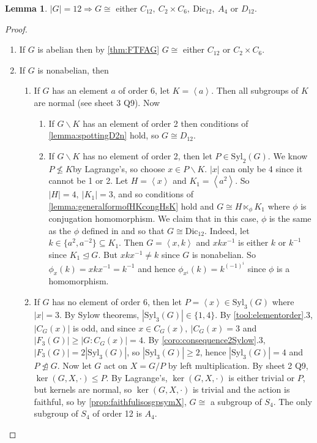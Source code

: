 \documentclass[a4paper]{article}
\newcommand{\la}{\left\langle}
\newcommand{\ra}{\right\rangle}
\newcommand{\Dic}{\text{Dic}}
\newcommand{\Syl}{\text{Syl}}
\theoremstyle{definition}
\newtheorem{lemma}[defn]{Lemma}
\begin{document}
\begin{lemma}
$|G|=12\Rightarrow G\cong$ either $C_{12},\ C_2\times C_6,\ \Dic_{12},\ A_4$ or $D_{12}$.
\end{lemma}
\begin{proof}
\begin{enumerate}
\item If $G$ is abelian then by \ref{thm:FTFAG} $G\cong$ either $C_{12}$ or $C_2\times C_6$.
\item If $G$ is nonabelian, then
\begin{enumerate}
\item If $G$ has an element $a$ of order 6, let $K=\la a\ra$. Then all subgroups of $K$ are normal (see sheet 3 Q9). Now
\begin{enumerate}
\item If $G\backslash K$ has an element of order 2 then conditions of \ref{lemma:spottingD2n} hold, so $G\cong D_{12}$.
\item If $G\backslash K$ has no element of order 2, then let $P\in\Syl_2(G)$. We know $P\not\leq K$by Lagrange's, so choose $x\in P\backslash K$. $|x|$ can only be 4 since it cannot be 1 or 2. Let $H=\la x\ra$ and $K_1=\la a^2\ra$. So $|H|=4,\ |K_1|=3$, and so conditions of \ref{lemma:generalformofHKcongHsK} hold and $G\cong H\ltimes_\phi K_1$ where $\phi$ is conjugation homomorphism. We claim that in this case, $\phi$ is the same as the $\phi$ defined in \label{defn:dic} and so that $G\cong\Dic_{12}$. Indeed, let $k\in\{a^2,a^{-2}\}\subseteq K_1$. Then $G=\la x,k\ra$ and $xkx^{-1}$ is either $k$ or $k^{-1}$ since $K_1\unlhd G$. But $xkx^{-1}\neq k$ since $G$ is nonabelian. So $\phi_x(k)=xkx^{-1}=k^{-1}$ and hence $\phi_{x^i}(k)=k^{(-1)^i}$ since $\phi$ is a homomorphism.
\end{enumerate}
\item If $G$ has no element of order 6, then let $P=\la x\ra\in \Syl_3(G)$ where $|x|=3$. By Sylow theorems, $|\Syl_3(G)|\in\{1,4\}$. By \ref{tool:elementorder}.3, $|C_G(x)|$ is odd, and since $x\in C_G(x),\ |C_G(x)=3$ and $|F_3(G)|\geq |G:C_G(x)|=4$. By \ref{coro:consequence2Sylow}.3, $|F_3(G)|=2|\Syl_3(G)|$, so $|\Syl_3(G)|\geq 2$, hence $|\Syl_3(G)|=4$ and $P\ntrianglelefteq G$. Now let $G$ act on $X=G/P$ by left multiplication. By sheet 2 Q9, $\ker(G,X,\cdot)\leq P$. By Lagrange's, $\ker(G,X,\cdot)$ is either trivial or $P$, but kernels are normal, so $\ker(G,X,\cdot)$ is trivial and the action is faithful, so by \ref{prop:faithfulisosgpsymX}, $G\cong$ a subgroup of $S_4$. The only subgroup of $S_4$ of order 12 is $A_4$.
\end{enumerate}
\end{enumerate}
\end{proof}
\end{document}
